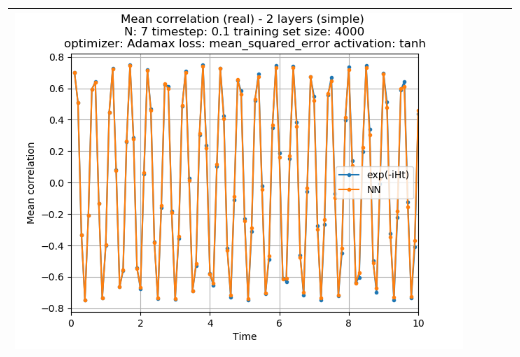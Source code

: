 \documentclass{article}
\begin{document}
\begin{tabular}{|c|c|c|c|}
     \includegraphics[scale=0.37]{./2_layers_simple_train_samples=4000_timestep=0.1_t_total=10.0_optimizer=Adamax_loss=mean_squared_error_activation=tanh/Corr_N=7_(real).png} \\ \hline


\end{tabular}
\end{document}
